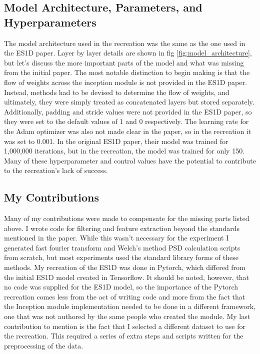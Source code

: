 \subsection{Model Architecture, Parameters, and Hyperparameters}
The model architecture used in the recreation was the same as the one used in the ES1D paper.
Layer by layer details are shown in fig \ref{fig:model_architecture}, but let's discuss the more important parts of the model and what was missing from the initial paper.
The most notable distinction to begin making is that the flow of weights across the inception module is not provided in the ES1D paper.
Instead, methods had to be devised to determine the flow of weights, and ultimately, they were simply treated as concatenated layers but stored separately.
Additionally, padding and stride values were not provided in the ES1D paper, so they were set to the default values of 1 and 0 respectively.
The learning rate for the Adam optimizer was also not made clear in the paper, so in the recreation it was set to 0.001.
In the original ES1D paper, their model was trained for 1,000,000 iterations, but in the recreation, the model was trained for only 150.
Many of these hyperparameter and control values have the potential to contribute to the recreation's lack of success.

\subsection{My Contributions}
Many of my contributions were made to compensate for the missing parts listed above. 
I wrote code for filtering and feature extraction beyond the standards mentioned in the paper.
While this wasn't necessary for the experiment I generated fast fourier transform and Welch's method PSD calculation scripts from scratch, but most experiments used the standard library forms of these methods.
My recreation of the ES1D was done in Pytorch, which differed from the initial ES1D model created in Tensorflow.
It should be noted, however, that no code was supplied for the ES1D model, so the importance of the Pytorch recreation comes less from the act of writing code and more from the fact that the Inception module implementation needed to be done in a different framework, one that was not authored by the same people who created the module.
My last contribution to mention is the fact that I selected a different dataset to use for the recreation. This required a series of extra steps and scripts written for the preprocessing of the data.


